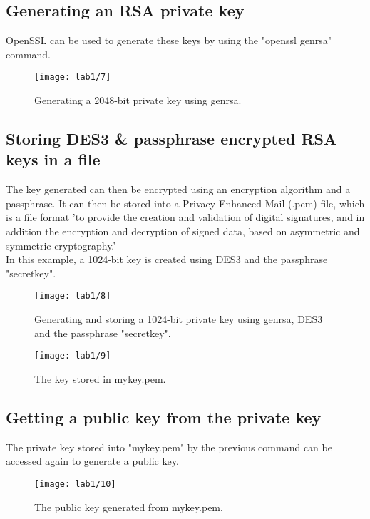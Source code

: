 \subsection{Generating an RSA private key}\label{subsec:rsa-private-key}
OpenSSL can be used to generate these keys by using the "openssl genrsa" command.

\begin{figure}[H]
    \centering
    \texttt{[image: lab1/7]}
    \caption{Generating a 2048-bit private key using genrsa.}
    \label{fig:genrsa}
\end{figure}

\pagebreak

\subsection{Storing DES3 \& passphrase encrypted RSA keys in a file}\label{subsec:storing-keys-in-file}
The key generated can then be encrypted using an encryption algorithm and a passphrase.
It can then be stored into a Privacy Enhanced Mail (.pem) file, which is
a file format 'to provide the creation and validation of digital signatures, and in addition the
encryption and decryption of signed data, based on asymmetric and symmetric cryptography.'
~\autocite[p. 1894]{PEMFormat}\\

\noindent In this example, a 1024-bit key is created using DES3 and the passphrase "secretkey".

\begin{figure}[H]
    \centering
    \texttt{[image: lab1/8]}
    \caption{Generating and storing a 1024-bit private key using genrsa, DES3 and the passphrase "secretkey".}
    \label{fig:DES3Key}
\end{figure}

\begin{figure}[H]
    \centering
    \texttt{[image: lab1/9]}
    \caption{The key stored in mykey.pem.}
    \label{fig:mykey}
\end{figure}

\subsection{Getting a public key from the private key}\label{subsec:PubFromPriv}
The private key stored into "mykey.pem" by the previous command can be accessed again to generate a public key.

\begin{figure}[H]
    \centering
    \texttt{[image: lab1/10]}
    \caption{The public key generated from mykey.pem.}
    \label{fig:pubKey}
\end{figure}

